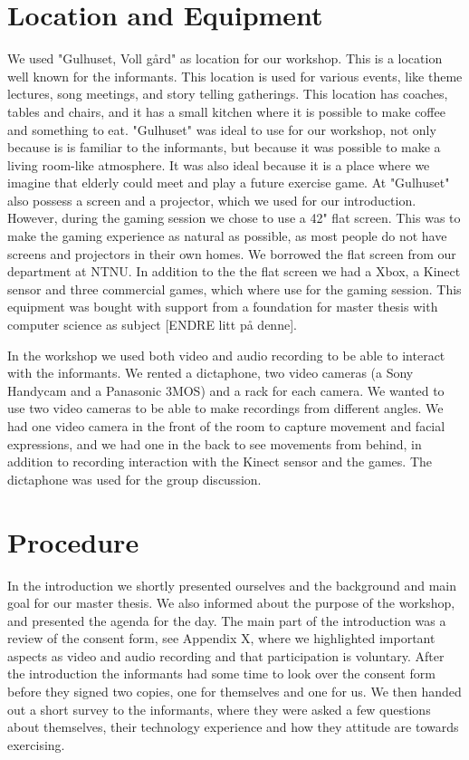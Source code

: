 \section{Location and Equipment}
We used "Gulhuset, Voll gård" as location for our workshop. This is a location well known for the informants. This location is used for various events, like theme lectures, song meetings, and story telling gatherings. This location has coaches, tables and chairs, and it has a small kitchen where it is possible to make coffee and something to eat. "Gulhuset" was ideal to use for our workshop, not only because is is familiar to the informants, but because it was possible to make a living room-like atmosphere. It was also ideal because it is a place where we imagine that elderly could meet and play a future exercise game. At "Gulhuset" also possess a screen and a projector, which we used for our introduction. However, during the gaming session we chose to use a 42" flat screen. This was to make the gaming experience as natural as possible, as most people do not have screens and projectors in their own homes. We borrowed the flat screen from our department at NTNU. In addition to the the flat screen we had a Xbox, a Kinect sensor and three commercial games, which where use for the gaming session. This equipment was bought with support from a foundation for master thesis with computer science as subject [ENDRE litt på denne].   

In the workshop we used both video and audio recording to be able to interact with the informants. We rented a dictaphone, two video cameras (a Sony Handycam and a Panasonic 3MOS) and a rack for each camera. We wanted to use two video cameras to be able to make recordings from different angles. We had one video camera in the front of the room to capture movement and facial expressions, and we had one in the back to see movements from behind, in addition to recording interaction with the Kinect sensor and the games. The dictaphone was used for the group discussion.      

\section{Procedure}
In the introduction we shortly presented ourselves and the background and main goal for our master thesis. We also informed about the purpose of the workshop, and presented the agenda for the day. The main part of the introduction was a review of the consent form, see Appendix X, where we highlighted important aspects as video and audio recording and that participation is voluntary. After the introduction the informants had some time to look over the consent form before they signed two copies, one for themselves and one for us. We then handed out a short survey to the informants, where they were asked a few questions about themselves, their technology experience and how they attitude are towards exercising. 

